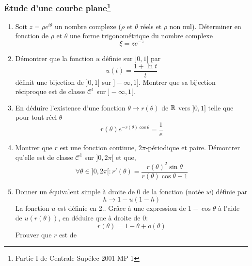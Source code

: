 \subsubsection*{{\'E}tude d'une courbe plane\footnote{Partie I de
Centrale Sup{\'e}lec 2001 MP 1}}
\begin{enumerate}
  \item Soit $z=\rho e^{i\theta}$ un nombre complexe ($\rho$ et $\theta$
  r{\'e}els et $\rho$ non nul). D{\'e}terminer en fonction de $\rho$ et
  $\theta$ une forme trigonom{\'e}trique du nombre complexe
  \[\xi=ze^{-z}\]
  \item D{\'e}montrer que la fonction $u$ d{\'e}finie sur $]0,1]$ par
  \[u(t)=\frac{1+\ln t}{t}\]
  d{\'e}finit une bijection de $]0,1]$ sur $]-\infty,1]$. Montrer que
  sa bijection r{\'e}ciproque est de classe $\mathcal{C}^1$ sur
  $]-\infty,1[$.
  \item En d{\'e}duire l'existence d'une fonction
  $\theta\mapsto r(\theta)$ de $\Bbb{R}$ vers $]0,1]$ telle que
  pour tout r{\'e}el $\theta$
  \[r(\theta)e^{-r(\theta)\cos \theta}=\frac{1}{e}\]
  \item Montrer que $r$ est une fonction continue,
  $2\pi$-p{\'e}riodique et paire. D{\'e}montrer qu'elle est de classe
  $\mathcal{C}^1$ sur $]0,2\pi[$ et que,
  \[\forall \theta \in ]0,2\pi[ : r'(\theta)=\frac{r(\theta)^2\sin \theta}{r(\theta)\cos \theta -1}\]
  \item Donner un {\'e}quivalent simple {\`a} droite de 0 de la fonction (not{\'e}e
  $w$)
  d{\'e}finie par
  \[h\rightarrow 1-u(1-h)\]
  La fonction $u$ est d{\'e}finie en 2.. Gr{\^a}ce {\`a} une expression de
  $1-\cos \theta$ {\`a} l'aide de $u(r(\theta))$, en d{\'e}duire que {\`a}
  droite de 0:
  \[r(\theta)=1-\theta +o(\theta)\]
  Prouver que $r$ est de
\end{enumerate}
